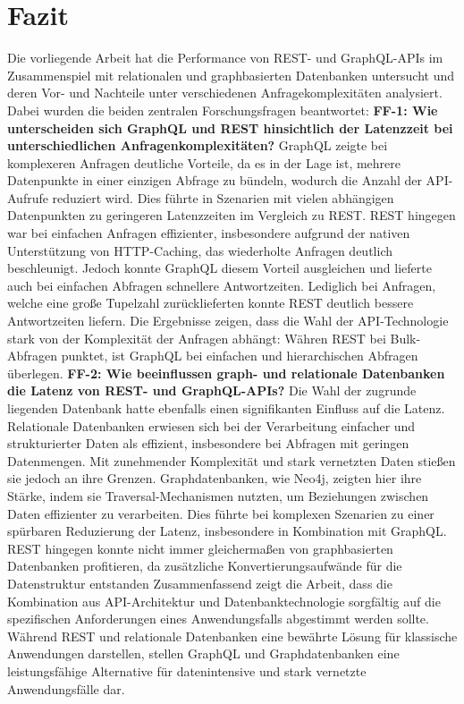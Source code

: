 \chapter{Fazit} %
\label{sec:fazit}
Die vorliegende Arbeit hat die Performance von REST- und GraphQL-APIs im Zusammenspiel mit relationalen und graphbasierten Datenbanken untersucht und deren Vor- und Nachteile unter verschiedenen Anfragekomplexitäten analysiert. Dabei wurden die beiden zentralen Forschungsfragen beantwortet:
\newline
\noindent
\textbf{FF-1: Wie unterscheiden sich GraphQL und REST hinsichtlich der Latenzzeit bei unterschiedlichen Anfragenkomplexitäten?}
GraphQL zeigte bei komplexeren Anfragen deutliche Vorteile, da es in der Lage ist, mehrere Datenpunkte in einer einzigen Abfrage zu bündeln, wodurch die Anzahl der API-Aufrufe reduziert wird. Dies führte in Szenarien mit vielen abhängigen Datenpunkten zu geringeren Latenzzeiten im Vergleich zu REST. REST hingegen war bei einfachen Anfragen effizienter, insbesondere aufgrund der nativen Unterstützung von HTTP-Caching, das wiederholte Anfragen deutlich beschleunigt. Jedoch konnte GraphQL diesem Vorteil ausgleichen und lieferte auch bei einfachen Abfragen schnellere Antwortzeiten. Lediglich bei Anfragen, welche eine große Tupelzahl zurücklieferten konnte REST deutlich bessere Antwortzeiten liefern. Die Ergebnisse zeigen, dass die Wahl der API-Technologie stark von der Komplexität der Anfragen abhängt: Währen REST bei Bulk-Abfragen punktet, ist GraphQL bei einfachen und hierarchischen Abfragen überlegen.
\newline
\noindent
\textbf{FF-2: Wie beeinflussen graph- und relationale Datenbanken die Latenz von REST- und GraphQL-APIs?}
Die Wahl der zugrunde liegenden Datenbank hatte ebenfalls einen signifikanten Einfluss auf die Latenz. Relationale Datenbanken erwiesen sich bei der Verarbeitung einfacher und strukturierter Daten als effizient, insbesondere bei Abfragen mit geringen Datenmengen. Mit zunehmender Komplexität und stark vernetzten Daten stießen sie jedoch an ihre Grenzen. Graphdatenbanken, wie Neo4j, zeigten hier ihre Stärke, indem sie Traversal-Mechanismen nutzten, um Beziehungen zwischen Daten effizienter zu verarbeiten. Dies führte bei komplexen Szenarien zu einer spürbaren Reduzierung der Latenz, insbesondere in Kombination mit GraphQL. REST hingegen konnte nicht immer gleichermaßen von graphbasierten Datenbanken profitieren, da zusätzliche Konvertierungsaufwände für die Datenstruktur entstanden
\newline
\noindent
Zusammenfassend zeigt die Arbeit, dass die Kombination aus API-Architektur und Datenbanktechnologie sorgfältig auf die spezifischen Anforderungen eines Anwendungsfalls abgestimmt werden sollte. Während REST und relationale Datenbanken eine bewährte Lösung für klassische Anwendungen darstellen, stellen GraphQL und Graphdatenbanken eine leistungsfähige Alternative für datenintensive und stark vernetzte Anwendungsfälle dar.





